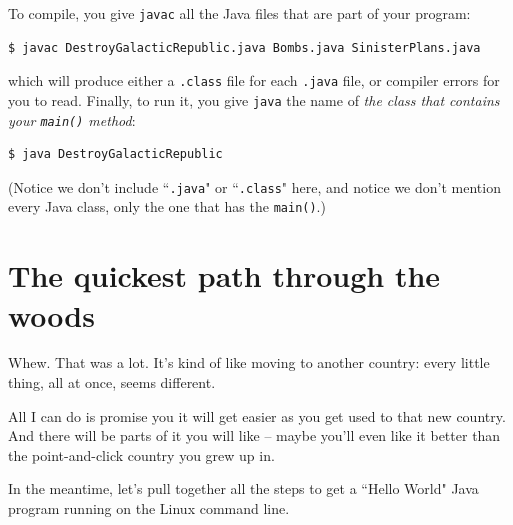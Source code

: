 \begin{enumerate}
To compile, you give \texttt{javac} all the Java files that are part of your
program:

\begin{verbatim}
$ javac DestroyGalacticRepublic.java Bombs.java SinisterPlans.java
\end{verbatim}

which will produce either a \texttt{.class} file for each \texttt{.java} file,
or compiler errors for you to read. Finally, to run it, you give \texttt{java}
the name of \textit{the class that contains your \texttt{main()} method}:

\begin{verbatim}
$ java DestroyGalacticRepublic
\end{verbatim}

(Notice we don't include ``\texttt{.java}" or ``\texttt{.class}" here, and
notice we don't mention every Java class, only the one that has the
\texttt{main()}.)

\end{enumerate}

\section{The quickest path through the woods}

Whew. That was a lot. It's kind of like moving to another country: every
little thing, all at once, seems different.

All I can do is promise you it will get easier as you get used to that new
country. And there will be parts of it you will like -- maybe you'll even like
it better than the point-and-click country you grew up in.

In the meantime, let's pull together all the steps to get a ``Hello World"
Java program running on the Linux command line.

